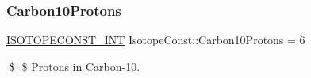 \subsubsection{\texorpdfstring{Carbon10\+Protons}{Carbon10Protons}}
{\footnotesize\ttfamily \mbox{\hyperlink{group___isotope_const-_macros_ga5f18360b3e99483a35c32d789e62621c}{I\+S\+O\+T\+O\+P\+E\+C\+O\+N\+S\+T\+\_\+\+I\+NT}} Isotope\+Const\+::\+Carbon10\+Protons = 6}

\$ \$ Protons in Carbon-\/10. 